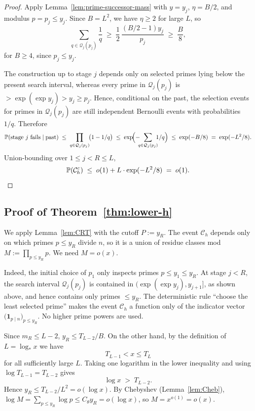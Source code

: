 \documentclass[11pt,reqno]{amsart}
\theoremstyle{plain}
\theoremstyle{definition}
\newcommand{\PP}{\mathbb{P}}
\newcommand{\logstar}{\log_{\!*}}
\begin{document}
\begin{proof}
Apply Lemma~\ref{lem:prime-successor-mass} with $y=y_j$, $\eta=B/2$, and
modulus $p=p_j\le y_j$. Since $B=L^2$, we have $\eta\ge 2$ for large $L$, so
\begin{equation}\label{eq:greedy-mass}
\sum_{q\in\mathcal Q_j(p_j)}\frac1q
\;\ge\;
\frac12\,\frac{(B/2-1)y_j}{p_j}
\;\ge\;
\frac{B}{8},
\end{equation}
for $B\ge 4$, since $p_j\le y_j$.

The construction up to stage $j$ depends only on selected primes lying below
the present search interval, whereas every prime in $\mathcal Q_j(p_j)$ is
$>\exp(\exp y_j)>y_j\ge p_j$. Hence, conditional on the past, the selection
events for primes in $\mathcal Q_j(p_j)$ are still independent Bernoulli events
with probabilities $1/q$. Therefore
\[
\PP(\text{stage $j$ fails}\mid\text{past})
\;\le\;
\prod_{q\in\mathcal Q_j(p_j)}\!\bigl(1-1/q\bigr)
\;\le\;
\exp\!\Bigl(-\!\!\!\sum_{q\in\mathcal Q_j(p_j)}\!\!\!1/q\Bigr)
\;\le\;
\exp(-B/8)
\;=\;
\exp(-L^2/8).
\]
Union-bounding over $1\le j<R\le L$,
\begin{equation}\label{eq:greedy-union}
\PP(\mathcal{C}_h^c) \;\le\; o(1) + L\cdot\exp(-L^2/8) \;=\; o(1). \qedhere
\end{equation}
\end{proof}

\subsection{Proof of Theorem~\ref{thm:lower-h}}

We apply Lemma~\ref{lem:CRT} with the cutoff $P:=y_R$. The event
$\mathcal{C}_h$ depends only on which primes $p\le y_R$ divide $n$, so it is a
union of residue classes mod $M:=\prod_{p\le y_R}p$. We need $M=o(x)$.

Indeed, the initial choice of $p_1$ only inspects primes $p\le y_1\le y_R$.
At stage $j<R$, the search interval $\mathcal Q_j(p_j)$ is contained in
$(\exp(\exp y_j),y_{j+1}]$, as shown above, and hence contains only primes
$\le y_R$. The deterministic rule ``choose the least selected prime'' makes the
event $\mathcal C_h$ a function only of the indicator vector
$\bigl(\mathbf 1_{p\mid n}\bigr)_{p\le y_R}$. No higher prime powers are used.

Since $m_R\le L-2$, $y_R\le T_{L-2}/B$. On the other hand, by the definition of
$L=\logstar x$ we have
\[
   T_{L-1}<x\le T_L
\]
for all sufficiently large $L$. Taking one logarithm in the lower inequality
and using $\log T_{L-1}=T_{L-2}$ gives
\begin{equation}\label{eq:logx-vs-T}
\log x \;>\; T_{L-2}.
\end{equation}
Hence $y_R\le T_{L-2}/L^2 = o(\log x)$. By Chebyshev (Lemma~\ref{lem:Cheb}),
$\log M=\sum_{p\le y_R}\log p\le C_\theta y_R = o(\log x)$, so $M=x^{o(1)}=o(x)$.
\end{document}

